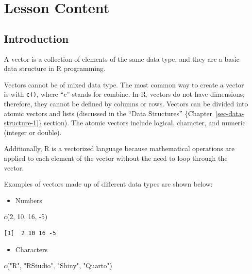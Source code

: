 \documentclass[
  letterpaper,
  DIV=11,
  numbers=noendperiod]{scrreprt}
\newenvironment{Shaded}{\begin{snugshade}}{\end{snugshade}}
\newcommand{\DecValTok}[1]{\textcolor[rgb]{0.68,0.00,0.00}{#1}}
\newcommand{\FunctionTok}[1]{\textcolor[rgb]{0.28,0.35,0.67}{#1}}
\newcommand{\NormalTok}[1]{\textcolor[rgb]{0.00,0.23,0.31}{#1}}
\newcommand{\SpecialCharTok}[1]{\textcolor[rgb]{0.37,0.37,0.37}{#1}}
\newcommand{\StringTok}[1]{\textcolor[rgb]{0.13,0.47,0.30}{#1}}
\providecommand{\tightlist}{%
  \setlength{\itemsep}{0pt}\setlength{\parskip}{0pt}}\usepackage{longtable,booktabs,array}
\begin{document}
\section{Lesson Content}\label{lesson-content-8}

\subsection{Introduction}\label{introduction-6}

A vector is a collection of elements of the same data type, and they are
a basic data structure in R programming.

Vectors cannot be of mixed data type. The most common way to create a
vector is with \texttt{c()}, where ``c'' stands for combine. In R,
vectors do not have dimensions; therefore, they cannot be defined by
columns or rows. Vectors can be divided into atomic vectors and lists
(discussed in the ``Data Structures''
\{Chapter~\ref{sec-data-structure-1}\} section). The atomic vectors
include logical, character, and numeric (integer or double).

Additionally, R is a vectorized language because mathematical operations
are applied to each element of the vector without the need to loop
through the vector.

Examples of vectors made up of different data types are shown below:

\begin{itemize}
\tightlist
\item
  Numbers
\end{itemize}

\begin{Shaded}
\begin{Highlighting}[]
\FunctionTok{c}\NormalTok{(}\DecValTok{2}\NormalTok{, }\DecValTok{10}\NormalTok{, }\DecValTok{16}\NormalTok{, }\SpecialCharTok{{-}}\DecValTok{5}\NormalTok{)}
\end{Highlighting}
\end{Shaded}

\begin{verbatim}
[1]  2 10 16 -5
\end{verbatim}

\begin{itemize}
\tightlist
\item
  Characters
\end{itemize}

\begin{Shaded}
\begin{Highlighting}[]
\FunctionTok{c}\NormalTok{(}\StringTok{"R"}\NormalTok{, }\StringTok{"RStudio"}\NormalTok{, }\StringTok{"Shiny"}\NormalTok{, }\StringTok{"Quarto"}\NormalTok{)}
\end{Highlighting}
\end{Shaded}
\end{document}
